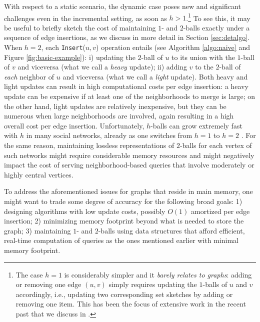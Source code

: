 With respect to a static scenario, the dynamic case poses new and significant challenges even in the incremental setting, as soon as $h > 1$.\footnote{The case $h = 1$ is considerably simpler and it \textit{barely relates to graphs}: adding or removing one edge $(u, v)$ simply requires updating the $1$-balls of $u$ and $v$ accordingly, i.e., updating two corresponding set sketches by adding or removing one item. This has been the focus of extensive work in the recent past that we discuss in .} To see this, it may be useful to briefly sketch the cost of maintaining $1$- and $2$-balls exactly under a sequence of edge insertions, as we discuss in more detail in Section \ref{sec:detalgo}. 
When $h = 2$, each \texttt{Insert}($u, v$) operation entails (see Algorithm \ref{algo:naive} and Figure \ref{fig:basic-example}): i) updating the $2$-ball of $u$ to its union with the $1$-ball of $v$ and viceversa (what we call a \textit{heavy} update); ii) adding $v$ to the $2$-ball of \emph{each} neighbor of $u$ and viceversa (what we call a \textit{light} update). Both heavy and light updates can result in high computational costs per edge insertion: a heavy update can be expensive if at least one of the neighborhoods to merge is large; on the other hand, light updates are relatively inexpensive, but they can be numerous when large neighborhoods are involved, again resulting in a high overall cost per edge insertion. Unfortunately, $h$-balls can grow extremely fast with $h$ in many social networks, already as one switches from $h = 1$ to $h = 2$ \cite{becchetti2008link,backstrom2012four}. For the same reason, maintaining lossless representations of $2$-balls for each vertex of such networks might require considerable memory resources and might negatively impact the cost of serving neighborhood-based queries that involve moderately or highly central vertices.


To address the aforementioned issues for graphs that reside in main memory, one might want to trade some degree of accuracy for the following broad goals: 1) designing algorithms with low update costs, possibly $O(1)$ amortized per edge insertion; 2) minimizing memory footprint beyond what is needed to store the graph; 3) maintaining $1$- and $2$-balls using data structures that afford efficient, real-time computation of queries as the ones mentioned earlier with minimal memory footprint.

